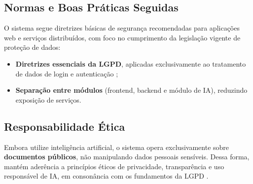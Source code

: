\subsection{Normas e Boas Práticas Seguidas}

O sistema segue diretrizes básicas de segurança recomendadas para aplicações web e serviços distribuídos, com foco no cumprimento da legislação vigente de proteção de dados:

\begin{itemize}
    \item \textbf{Diretrizes essenciais da LGPD}, aplicadas exclusivamente ao tratamento de dados de login e autenticação \cite{brasil_lei_13709_2018};
    \item \textbf{Separação entre módulos} (frontend, backend e módulo de IA), reduzindo exposição de serviços.
\end{itemize}

\subsection{Responsabilidade Ética}

Embora utilize inteligência artificial, o sistema opera exclusivamente sobre \textbf{documentos públicos}, não manipulando dados pessoais sensíveis. Dessa forma, mantém aderência a princípios éticos de privacidade, transparência e uso responsável de IA, em consonância com os fundamentos da LGPD \cite{brasil_lei_13709_2018}.
